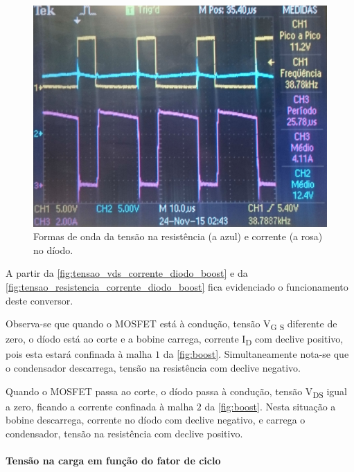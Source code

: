 \documentclass[a4paper,11pt]{article}
\numberwithin{equation}{section}
\begin{document}
\begin{figure}[H]
	\centering
	\includegraphics[keepaspectratio=true, scale=0.175]{img/figs/tensao_resistencia_corrente_diodo_boost}
	\caption{Formas de onda da tensão na resistência (a azul) e corrente (a rosa) no díodo.}
	\label{fig:tensao_resistencia_corrente_diodo_boost}
	\vspace{-0.8em}
\end{figure}

A partir da \autoref{fig:tensao_vds_corrente_diodo_boost} e da \autoref{fig:tensao_resistencia_corrente_diodo_boost} fica evidenciado o funcionamento deste conversor. 

Observa-se que quando o MOSFET está à condução, tensão V\textsubscript{G S} diferente de zero, o díodo está ao corte e a bobine carrega, corrente I\textsubscript{D} com declive positivo, pois esta estará confinada à malha $1$ da \autoref{fig:boost}. Simultaneamente nota-se que o condensador descarrega, tensão na resistência com declive negativo.

Quando o MOSFET passa ao corte, o díodo passa à condução, tensão V\textsubscript{DS} igual a zero, ficando a corrente confinada à malha $2$ da \autoref{fig:boost}. Nesta situação a bobine descarrega, corrente no díodo com declive negativo, e carrega o condensador, tensão na resistência com declive positivo.

\paragraph{Tensão na carga em função do fator de ciclo}\mbox{}\
\end{document}
